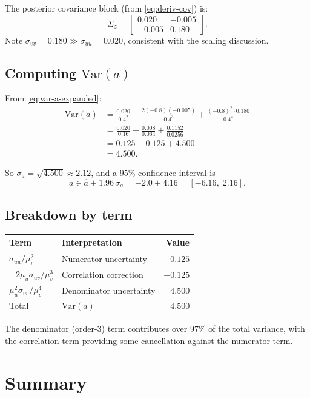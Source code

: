 \documentclass[11pt]{article}
\begin{document}
The posterior covariance block (from \eqref{eq:deriv-cov}) is:
\[
\Sigma_z = \begin{bmatrix} 0.020 & -0.005 \\ -0.005 & 0.180 \end{bmatrix}.
\]
Note $\sigma_{vv} = 0.180 \gg \sigma_{uu} = 0.020$, consistent with the scaling discussion.

\subsection{Computing $\mathrm{Var}(a)$}

From \eqref{eq:var-a-expanded}:
\begin{align*}
\mathrm{Var}(a)
&= \frac{0.020}{0.4^2} - \frac{2(-0.8)(-0.005)}{0.4^3} + \frac{(-0.8)^2 \cdot 0.180}{0.4^4} \\[6pt]
&= \frac{0.020}{0.16} - \frac{0.008}{0.064} + \frac{0.1152}{0.0256} \\[6pt]
&= 0.125 - 0.125 + 4.500 \\[6pt]
&= 4.500.
\end{align*}

So $\sigma_a = \sqrt{4.500} \approx 2.12$, and a 95\% confidence interval is
\[
a \in \hat{a} \pm 1.96\,\sigma_a = -2.0 \pm 4.16 = [-6.16, \; 2.16].
\]

\subsection{Breakdown by term}

\begin{center}
\begin{tabular}{llr}
\toprule
Term & Interpretation & Value \\
\midrule
$\sigma_{uu}/\mu_v^2$ & Numerator uncertainty & $0.125$ \\
$-2\mu_u\sigma_{uv}/\mu_v^3$ & Correlation correction & $-0.125$ \\
$\mu_u^2\sigma_{vv}/\mu_v^4$ & Denominator uncertainty & $4.500$ \\
\midrule
Total & $\mathrm{Var}(a)$ & $4.500$ \\
\bottomrule
\end{tabular}
\end{center}

The denominator (order-3) term contributes over 97\% of the total variance, with the correlation term providing some cancellation against the numerator term.

\section{Summary}
\end{document}
